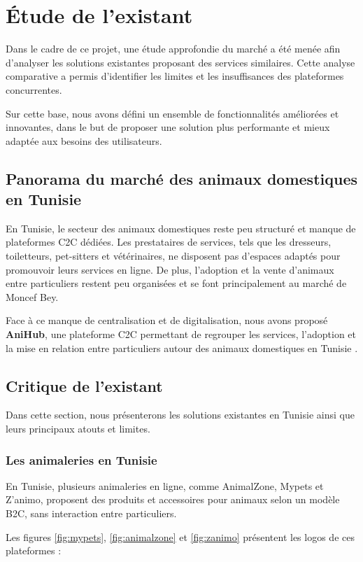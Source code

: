\section{Étude de l’existant}

Dans le cadre de ce projet, une étude approfondie du marché a été menée afin d’analyser les solutions existantes proposant des services similaires. Cette analyse comparative a permis d’identifier les limites et les insuffisances des plateformes concurrentes.

Sur cette base, nous avons défini un ensemble de fonctionnalités améliorées et innovantes, dans le but de proposer une solution plus performante et mieux adaptée aux besoins des utilisateurs. 

\subsection{Panorama du marché des animaux domestiques en Tunisie} 
En Tunisie, le secteur des animaux domestiques reste peu structuré et manque de plateformes C2C dédiées. Les prestataires de services, tels que les dresseurs, toiletteurs, pet-sitters et vétérinaires, ne disposent pas d’espaces adaptés pour promouvoir leurs services en ligne. De plus, l’adoption et la vente d’animaux entre particuliers restent peu organisées et se font principalement au marché de Moncef Bey.

Face à ce manque de centralisation et de digitalisation, nous avons proposé \textbf{AniHub}, une plateforme C2C permettant de regrouper les services, l’adoption et la mise en relation entre particuliers autour des animaux domestiques en Tunisie . 
\subsection{Critique de l’existant} 
Dans cette section, nous présenterons les solutions existantes en Tunisie ainsi que leurs principaux atouts et limites. 
\subsubsection{Les animaleries en Tunisie}

En Tunisie, plusieurs animaleries en ligne, comme AnimalZone, Mypets et Z’animo, proposent des produits et accessoires pour animaux selon un modèle B2C, sans interaction entre particuliers.

Les figures \ref{fig:mypets}, \ref{fig:animalzone} et \ref{fig:zanimo} présentent les logos de ces plateformes :

